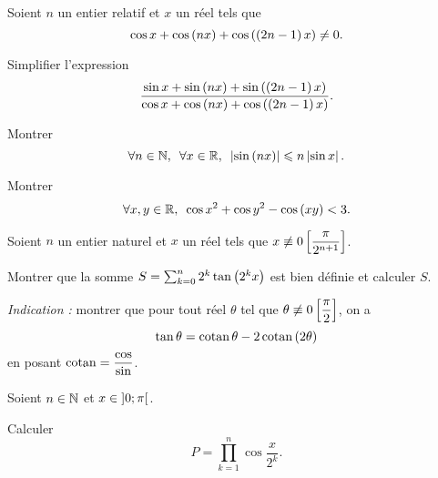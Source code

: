 \begin{exo}
Soient \(n\) un entier relatif et \(x\) un réel tels que \[\cos x+\cos\left(nx\right)+\cos\left(\left(2n-1\right)x\right)\not=0.\]

Simplifier l'expression \[\dfrac{\sin x+\sin\left(nx\right)+\sin\left(\left(2n-1\right)x\right)}{\cos x+\cos\left(nx\right)+\cos\left(\left(2n-1\right)x\right)}.\]
\end{exo}

\begin{corr}
\end{corr}

\begin{exo}
Montrer \[\quantifs{\forall n\in\N;\forall x\in\R}\abs{\sin\paren{nx}}\leq n\abs{\sin x}.\]
\end{exo}

\begin{corr}
\end{corr}

\begin{exo}
Montrer \[\quantifs{\forall x,y\in\R}\cos x^2+\cos y^2-\cos\paren{xy}<3.\]
\end{exo}

\begin{corr}
\end{corr}

\begin{exo}
Soient \(n\) un entier naturel et \(x\) un réel tels que \(x\not\equiv0\left[\dfrac{\pi}{2^{n+1}}\right]\).

Montrer que la somme \(S=\sum_{k=0}^{n}2^k\tan\left(2^kx\right)\) est bien définie et calculer \(S\).

\textit{Indication :} montrer que pour tout réel \(\theta\) tel que \(\theta\not\equiv0\left[\dfrac{\pi}{2}\right]\), on a \[\tan\theta=\operatorname{cotan}\theta-2\operatorname{cotan}\left(2\theta\right)\] en posant \(\operatorname{cotan}=\dfrac{\cos}{\sin}\).
\end{exo}

\begin{corr}
\end{corr}

\begin{exo}
Soient \(n\in\mathbb{N}\) et \(x\in\left]0;\pi\right[\).

Calculer \[P=\prod_{k=1}^{n}\cos\dfrac{x}{2^k}.\]
\end{exo}

\begin{corr}
\end{corr}

